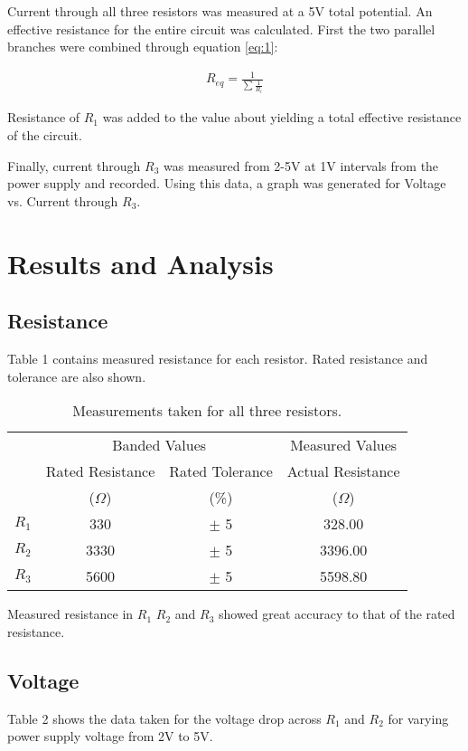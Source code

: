 \documentclass[CMPE]{KGCOEReport}
\begin{document}
Current through all three resistors was measured at a 5V total potential. An effective resistance for the entire circuit was calculated. First the two parallel branches were combined through equation \ref{eq:1}:

\begin{gather}
\label{eq:1}
R_{eq} = \frac{1}{ \sum\frac{1}{R_i} }
\end{gather}

Resistance of $R_1$ was added to the value about yielding a total effective resistance of the circuit.  

Finally, current through $R_3$ was measured from 2-5V at 1V intervals from the power supply and recorded. Using this data, a graph was generated for Voltage vs. Current through $R_3$.

\section*{Results and Analysis}
\subsection*{Resistance}

Table 1 contains measured resistance for each resistor. Rated resistance and tolerance are also shown.

\begin{table}[h]
\caption{Measurements taken for all three resistors.}
\begin{center}
\begin{tabular}{cc|c|c}
& \multicolumn{2}{c}{Banded Values} & Measured Values  \\\cline{2-4}
\multirow{2}{*}{}
& Rated Resistance & Rated Tolerance & Actual Resistance \\
& ($\Omega$) & (\%) & ($\Omega$) \\\cline{2-4}
$R_1$ & 330 & $\pm$ 5 & 328.00 \\\cline{2-4}
$R_2$ & 3330 & $\pm$ 5 & 3396.00 \\\cline{2-4}
$R_3$ & 5600 & $\pm$ 5 & 5598.80 \\\cline{2-4}
\end{tabular}
\end{center}
\end{table}

Measured resistance in $R_1$ $R_2$ and $R_3$ showed great accuracy to that of the rated resistance. 

\subsection*{Voltage}
Table 2 shows the data taken for the voltage drop across $R_1$ and $R_2$ for varying power supply voltage from 2V to 5V.
\end{document}

